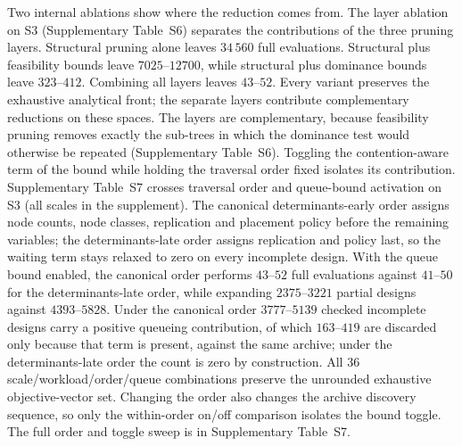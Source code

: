 \documentclass[pdflatex,sn-nature,lineno]{sn-jnl}
\newcommand{\SthreeEvalRange}{43\text{--}52}
\newcommand{\RefAblationSite}{Supplementary Table~S6}
\newcommand{\RefOrderTab}{Supplementary Table~S7}
\begin{document}
Two internal ablations show where the reduction comes from.
%
The layer ablation on S3 (\RefAblationSite{}) separates the contributions of the three pruning layers. Structural pruning alone leaves $34\,560$ full evaluations. Structural plus feasibility bounds leave $7025\text{--}12700$, while structural plus dominance bounds leave $323\text{--}412$. Combining all layers leaves $\SthreeEvalRange$. Every variant preserves the exhaustive analytical front; the separate layers contribute complementary reductions on these spaces.
The layers are complementary, because feasibility pruning removes exactly the sub-trees in
which the dominance test would otherwise be repeated (Supplementary Table~S6). Toggling
the contention-aware term of the bound while holding the traversal order fixed isolates
its contribution.
%
\RefOrderTab{} crosses traversal order and queue-bound activation on S3 (all scales in the supplement). The canonical determinants-early order assigns node counts, node classes, replication and placement policy before the remaining variables; the determinants-late order assigns replication and policy last, so the waiting term stays relaxed to zero on every incomplete design. With the queue bound enabled, the canonical order performs $43\text{--}52$ full evaluations against $41\text{--}50$ for the determinants-late order, while expanding $2375\text{--}3221$ partial designs against $4393\text{--}5828$. Under the canonical order $3777\text{--}5139$ checked incomplete designs carry a positive queueing contribution, of which $163\text{--}419$ are discarded only because that term is present, against the same archive; under the determinants-late order the count is zero by construction. All 36 scale/workload/order/queue combinations preserve the unrounded exhaustive objective-vector set. Changing the order also changes the archive discovery sequence, so only the within-order on/off comparison isolates the bound toggle.
The full order and toggle sweep is in Supplementary Table~S7.
\end{document}
